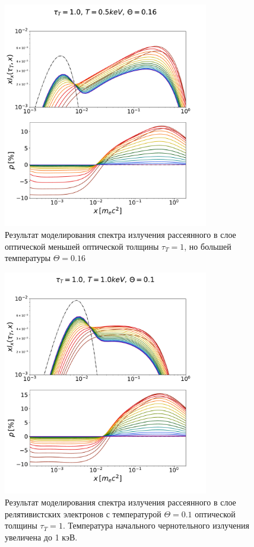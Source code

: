 \documentclass[14pt,a4paper]{extarticle}
\begin{document}
			\newpage
			\begin{figure}[H]
				\centering
				\includegraphics[width=0.8\textwidth]{CM1zAll.pdf}
				\caption{\small
				Результат моделирования спектра излучения рассеянного в слое
			    оптической меньшей оптической толщины $\tau_T=1$,  
			    но большей температуры $\Theta=0.16$
				}\label{fig:Comp2}
			\end{figure}
			\newpage
			\begin{figure}[H]
				\centering
				\includegraphics[width=0.8\textwidth]{C0zAll.pdf}
				\caption{\small
				Результат моделирования спектра излучения рассеянного в слое 
					 релятивистских электронов с температурой $\Theta=0.1$ оптической толщины $\tau_T=1$.
					Температура начального чернотельного излучения увеличена до 1 кэВ.
				}\label{fig:Comp4}
			\end{figure}
\end{document}
